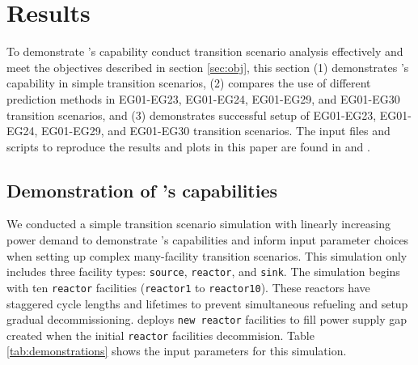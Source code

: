 \section{Results}
To demonstrate \deploy's capability conduct transition
scenario analysis effectively and meet the objectives described in section 
\ref{sec:obj}, this section 
(1) demonstrates \deploy's capability in simple transition scenarios, 
(2) compares the use of different prediction methods in  EG01-EG23, EG01-EG24, 
EG01-EG29, and EG01-EG30 transition scenarios, and
(3) demonstrates successful \deploy setup of EG01-EG23, EG01-EG24, 
EG01-EG29, and EG01-EG30 transition scenarios. 
The input files and scripts to reproduce the results and plots in this
paper are found in \cite{noauthor_arfc/d3ploy:_2019} and 
\cite{chee_arfc/transition-scenarios_2018}. 

\subsection{Demonstration of \deploy's capabilities}
\label{sec:demo}
We conducted a simple transition scenario simulation with
linearly increasing power demand
to demonstrate \deploy's capabilities and inform input parameter 
choices when setting up complex many-facility transition scenarios. 
This simulation only includes
three facility types: \texttt{source}, \texttt{reactor}, and 
\texttt{sink}. 
The simulation begins with ten \texttt{reactor} facilities 
(\texttt{reactor1} to \texttt{reactor10}). 
These reactors have staggered cycle lengths and lifetimes to prevent 
simultaneous refueling and setup gradual decommissioning. 
\deploy deploys \texttt{new reactor} facilities
to fill power supply gap created when the initial \texttt{reactor} 
facilities decommision. 
Table \ref{tab:demonstrations} shows the \deploy input parameters 
for this simulation.  


